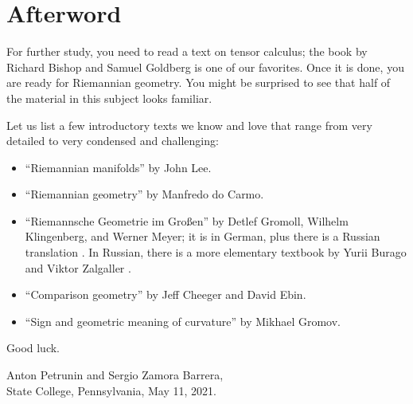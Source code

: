 \chapter{Afterword}

For further study, you need to read a text on tensor calculus;
the book by Richard Bishop and Samuel Goldberg \cite{bishop-goldberg} is one of our favorites.
Once it is done, you are ready for Riemannian geometry.
You might be surprised to see that half of the material in this subject looks familiar.

Let us list a few introductory texts we know and love that range from very detailed to very condensed and challenging:
\begin{itemize}
\item ``Riemannian manifolds''  \cite{lee2006riemannian} by John Lee.
\item ``Riemannian geometry'' \cite{carmo1992riemannian} by Manfredo do Carmo.
\item ``Riemannsche Geometrie im Großen'' \cite{gromoll-klingenberg-meyer} by 
Detlef Gromoll,
Wilhelm Klingenberg, 
and  Werner Meyer;
it is in German, plus there is a Russian translation \cite{gromoll-klingenberg-meyer-ru}.
In Russian, there is a more elementary textbook by Yurii Burago and Viktor Zalgaller \cite{burago-zalgaller}.
\item ``Comparison geometry'' \cite{cheeger-ebin} by Jeff Cheeger and David Ebin. 
\item ``Sign and geometric meaning of curvature'' \cite{gromov-1991} by Mikhael Gromov.
\end{itemize}
Good luck.

\begin{flushright}
Anton Petrunin and Sergio Zamora Barrera,\\
State College, Pennsylvania, May 11, 2021.
\end{flushright}
